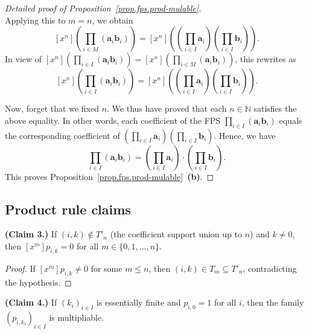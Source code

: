 \begin{proof}[Detailed proof of Proposition~\ref{prop.fps.prod-mulable}]
\[\]
Applying this to $m = n$, we obtain
\[
\left[x^{n}\right] \left(\prod_{i \in M}
  \left(\mathbf{a}_{i} \mathbf{b}_{i}\right)\right)
= \left[x^{n}\right] \left(
  \left(\prod_{i \in I} \mathbf{a}_{i}\right)
  \left(\prod_{i \in I} \mathbf{b}_{i}\right)\right).
\]
In view of
$\left[x^{n}\right] \left(\prod_{i \in I}
  \left(\mathbf{a}_{i} \mathbf{b}_{i}\right)\right)
= \left[x^{n}\right] \left(\prod_{i \in M}
  \left(\mathbf{a}_{i} \mathbf{b}_{i}\right)\right)$,
this rewrites as
\[
\left[x^{n}\right] \left(\prod_{i \in I}
  \left(\mathbf{a}_{i} \mathbf{b}_{i}\right)\right)
= \left[x^{n}\right] \left(
  \left(\prod_{i \in I} \mathbf{a}_{i}\right)
  \left(\prod_{i \in I} \mathbf{b}_{i}\right)\right).
\]

Now, forget that we fixed $n$. We thus have proved that each
$n \in \mathbb{N}$ satisfies the above equality. In other words, each
coefficient of the FPS
$\prod_{i \in I} \left(\mathbf{a}_{i} \mathbf{b}_{i}\right)$ equals the
corresponding coefficient of
$\left(\prod_{i \in I} \mathbf{a}_{i}\right)
\left(\prod_{i \in I} \mathbf{b}_{i}\right)$.
Hence, we have
\[
\prod_{i \in I} \left(\mathbf{a}_{i} \mathbf{b}_{i}\right)
= \left(\prod_{i \in I} \mathbf{a}_{i}\right)
  \cdot \left(\prod_{i \in I} \mathbf{b}_{i}\right).
\]
This proves Proposition~\ref{prop.fps.prod-mulable}~\textbf{(b)}.
\end{proof}

\subsection{Product rule claims}

\begin{lemma}
\label{lem.fps.infprod.claim3}
\leanhelper
\leanok
\textbf{(Claim 3.)}
If $(i,k) \notin T'_n$ (the coefficient support union up to $n$) and $k \neq 0$,
then $[x^m] p_{i,k} = 0$ for all $m \in \{0,1,\ldots,n\}$.
\end{lemma}

\begin{proof}
\leanok
If $[x^m] p_{i,k} \neq 0$ for some $m \leq n$, then $(i,k) \in T_m \subseteq T'_n$,
contradicting the hypothesis.
\end{proof}

\begin{lemma}
\label{lem.fps.infprod.claim4}
\leanhelper
\leanok
\textbf{(Claim 4.)}
If $(k_i)_{i \in I}$ is essentially finite and $p_{i,0} = 1$ for all $i$,
then the family $(p_{i,k_i})_{i \in I}$ is multipliable.
\end{lemma}

